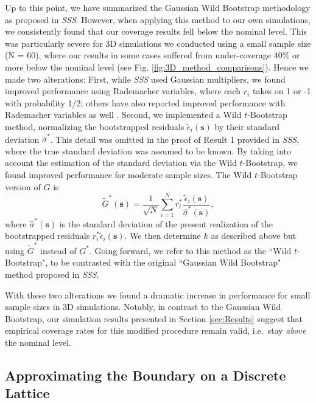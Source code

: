 Up to this point, we have summarized the Gaussian Wild Bootstrap methodology as proposed in \textit{SSS}. However, when applying this method to our own simulations, we consistently found that our coverage results fell below the nominal level.  This was particularly severe for 3D simulations we conducted using a small sample size (N = 60), where our results in some cases suffered from under-coverage 40\% or more below the nominal level (see Fig. \ref{fig:3D_method_comparisons}). Hence we made two alterations: First, while \textit{SSS} used Gaussian multipliers, we found improved performance using Rademacher variables, where each $r_i$ takes on 1 or -1 with  probability 1/2; others have also reported improved performance with Rademacher variables as well \citep{Davidson2008-qh}. Second, we implemented a Wild $t$-Bootstrap \citep{Telschow2019-lg} method, normalizing the bootstrapped residuals $\tilde{\epsilon}_{i}(\bm{s})$ by their standard deviation $\hat{\sigma}^*$. This detail was omitted in the proof of Result 1 provided in \textit{SSS}, where the true standard deviation was assumed to be known. By taking into account the estimation of the standard deviation via the Wild $t$-Bootstrap, we found improved performance for moderate sample sizes. The Wild $t$-Bootstrap version of $G$ is
\begin{equation}
\label{eq:wild_bootstrap_G}
\tilde{G}^{*}(\bm{s}) = \frac{1}{\sqrt{N}}\sum_{i=1}^{N} r^*_i\frac{\tilde{\epsilon}_{i}(\bm{s})}{\hat{\sigma}^*(\bm{s})},
\end{equation}
 where $\hat{\sigma}^{*}(\bm{s})$ is the standard deviation of the present realization of the bootstrapped residuals $r^*_i\tilde{\epsilon}_{i}(\bm{s})$. We then determine $k$ as described above but using $\tilde{G}^{*}$ instead of $G^*$. Going forward, we refer to this method as the ``Wild $t$-Bootstrap", to be contrasted with the original ``Gaussian Wild Bootstrap" method proposed in \textit{SSS}.

With these two alterations we found a dramatic increase in performance for small sample sizes in 3D simulations. 
Notably, in contrast to the Gaussian Wild Bootstrap, our simulation results presented in Section \ref{sec:Results} suggest that empirical coverage rates for this modified procedure remain valid, i.e.~stay \textit{above} the nominal level.  

\subsection{Approximating the Boundary on a Discrete Lattice}
\label{sec:boundary_discrete_lattice}

